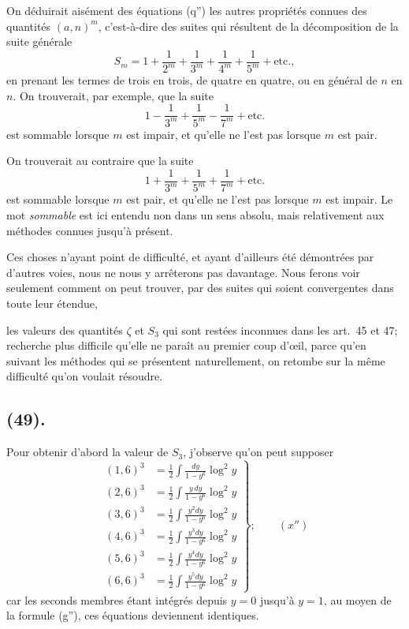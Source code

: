 \documentclass{article}
\begin{document}
On déduirait aisément des équations (q'') les autres propriétés connues des quantités $(a,n)^{m}$, c'est-à-dire des suites qui résultent de la décomposition de la suite générale
\[ S_{m}=1+\frac{1}{2^{m}}+\frac{1}{3^{m}}+\frac{1}{4^{m}}+\frac{1}{5^{m}}+\text{etc.}, \]
en prenant les termes de trois en trois, de quatre en quatre, ou en général de $n$ en $n$. On trouverait, par exemple, que la suite
\[ 1-\frac{1}{3^{m}}+\frac{1}{5^{m}}-\frac{1}{7^{m}}+\text{etc.} \]
est sommable lorsque $m$ est impair, et qu'elle ne l'est pas lorsque $m$ est pair.

On trouverait au contraire que la suite
\[ 1+\frac{1}{3^{m}}+\frac{1}{5^{m}}+\frac{1}{7^{m}}+\text{etc.} \]
est sommable lorsque $m$ est pair, et qu'elle ne l'est pas lorsque $m$ est impair. Le mot \emph{sommable} est ici entendu non dans un sens absolu, mais relativement aux méthodes connues jusqu'à présent.

Ces choses n'ayant point de difficulté, et ayant d'ailleurs été démontrées par d'autres voies, nous ne nous y arrêterons pas davantage. Nous ferons voir seulement comment on peut trouver, par des suites qui soient convergentes dans toute leur étendue,

les valeurs des quantités $\zeta$ et $S_{3}$ qui sont restées inconnues dans les art.\ 45 et 47; recherche plus difficile qu'elle ne paraît au premier coup d'œil, parce qu'en suivant les méthodes qui se présentent naturellement, on retombe sur la même difficulté qu'on voulait résoudre.

\subsection*{(49).}

Pour obtenir d'abord la valeur de $S_{3}$, j'observe qu'on peut supposer
\[ \left.\begin{aligned} (1,6)^{3}&=\frac{1}{2}\int\frac{dy}{1-y^{6}}\log^{2}y\\ (2,6)^{3}&=\frac{1}{2}\int\frac{y\,dy}{1-y^{6}}\log^{2}y\\ (3,6)^{3}&=\frac{1}{2}\int\frac{y^{2}dy}{1-y^{6}}\log^{2}y\\ (4,6)^{3}&=\frac{1}{2}\int\frac{y^{3}dy}{1-y^{6}}\log^{2}y\\ (5,6)^{3}&=\frac{1}{2}\int\frac{y^{4}dy}{1-y^{6}}\log^{2}y\\ (6,6)^{3}&=\frac{1}{2}\int\frac{y^{5}dy}{1-y^{6}}\log^{2}y \end{aligned}\right\};\qquad(x'') \]
car les seconds membres étant intégrés depuis $y=0$ jusqu'à $y=1$, au moyen de la formule (g''), ces équations deviennent identiques.
\end{document}
